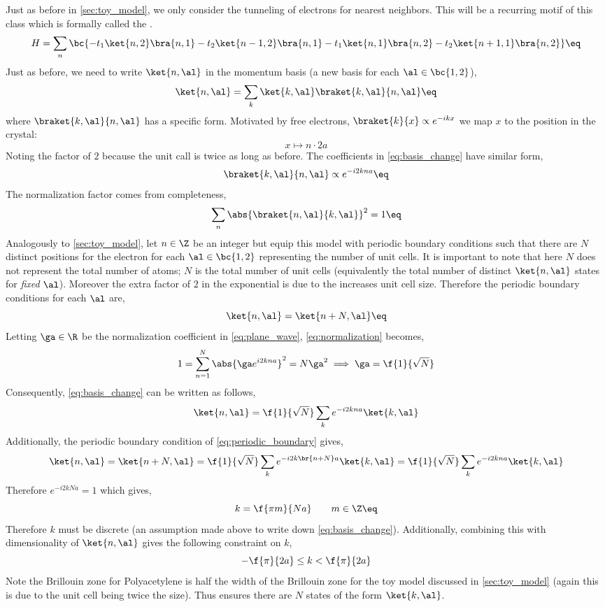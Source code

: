 \documentclass{article}
\begin{document}
Just as before in \cref{sec:toy_model}, we only consider the tunneling of electrons for nearest neighbors. This will be a recurring motif of this class which is formally called the .
\[ H = \sum_{n} \bc{ - t_1 \ket{n, 2} \bra{n, 1} - t_2 \ket{n-1, 2} \bra{n, 1} - t_1 \ket{n, 1} \bra{n, 2} - t_2 \ket{n+1, 1} \bra{n, 2}} \eq \label{eq:polyacetylene_tight_binding}\]
Just as before, we need to write $\ket{n, \al}$ in the momentum basis (a new basis for each $\al \in \bc{1,2}$),
\[ \ket{n, \al} = \sum_{k} \ket{k,\al} \braket{k, \al}{n, \al} \eq \label{eq:basis_change}\]
where $\braket{k, \al}{n, \al}$ has a specific form. Motivated by free electrons, $\braket{k}{x} \propto e^{-ikx}$ we map $x$ to the position in the crystal:
\[ x \mapsto n\cdot2a \]
Noting the factor of $2$ because the unit call is twice as long as before. The coefficients in \cref{eq:basis_change} have similar form,
\[ \braket{k, \al}{n, \al} \propto e^{- i2kna} \eq \label{eq:plane_wave}\]
The normalization factor comes from completeness,
\[ \sum_{n} \abs{\braket{n, \al}{k, \al}}^2 = 1 \eq \label{eq:normalization}\]
Analogously to \cref{sec:toy_model}, let $n \in \Z$ be an integer but equip this model with periodic boundary conditions such that there are $N$ distinct positions for the electron for each $\al \in \bc{1,2}$ representing the number of unit cells. It is important to note that here $N$ does not represent the total number of atoms; $N$ is the total number of unit cells (equivalently the total number of distinct $\ket{n, \al}$ states for \textit{fixed} $\al$). Moreover the extra factor of $2$ in the exponential is due to the increases unit cell size.
Therefore the periodic boundary conditions for each $\al$ are,
\[ \ket{n, \al} = \ket{n + N, \al} \eq \label{eq:periodic_boundary}\]
Letting $\ga \in \R$ be the normalization coefficient in \cref{eq:plane_wave}, \cref{eq:normalization} becomes,
\[ 1 = \sum_{n=1}^{N} \abs{\ga e^{i2kna}}^2 = N \ga^2 \implies \ga = \f{1}{\sqrt{N}}\]
Consequently, \cref{eq:basis_change} can be written as follows,
\[ \ket{n, \al} = \f{1}{\sqrt{N}} \sum_{k} e^{- i2kna} \ket{k, \al}  \]
Additionally, the periodic boundary condition of \cref{eq:periodic_boundary} gives,
\[  \ket{n, \al} =\ket{n+N, \al} = \f{1}{\sqrt{N}} \sum_{k} e^{- i2k\br{n+N}a} \ket{k, \al} = \f{1}{\sqrt{N}} \sum_{k} e^{- i2kna} \ket{k, \al}  \]
Therefore $e^{- i2kNa} = 1$ which gives,
\[ k = \f{\pi m}{Na} \qquad m \in \Z \eq \label{eq:k_discrete}\]
Therefore $k$ must be discrete (an assumption made above to write down \cref{eq:basis_change}). Additionally, combining this with dimensionality of $\ket{n, \al}$ gives the following constraint on $k$,
\[ -\f{\pi}{2a} \leq k < \f{\pi}{2a} \]
Note the Brillouin zone for Polyacetylene is half the width of the Brillouin zone for the toy model discussed in \cref{sec:toy_model} (again this is due to the unit cell being twice the size). Thus ensures there are $N$ states of the form $\ket{k, \al}$. \\
\end{document}
